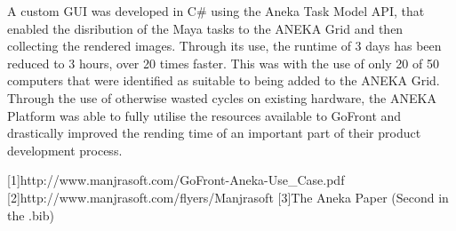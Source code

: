 A custom GUI was developed in C\# using the Aneka Task Model API, that enabled the disribution of the Maya tasks to the ANEKA Grid and then collecting the rendered images. Through its use, the runtime of 3 days has been reduced to 3 hours, over 20 times faster. This was with the use of only 20 of 50 computers that were identified as suitable to being added to the ANEKA Grid. Through the use of otherwise wasted cycles on existing hardware, the ANEKA Platform was able to fully utilise the resources available to GoFront and drastically improved the rending time of an important part of their product development process. 

[1]http://www.manjrasoft.com/GoFront-Aneka-Use\_Case.pdf
[2]http://www.manjrasoft.com/flyers/Manjrasoft%
[3]The Aneka Paper (Second in the .bib)
